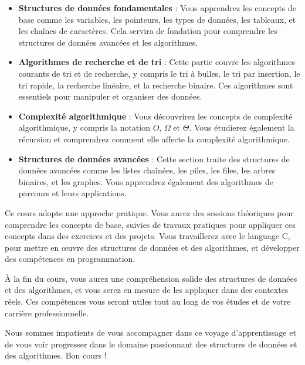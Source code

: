 \begin{itemize}
	\item \textbf{Structures de données fondamentales} : Vous apprendrez les concepts de base comme les variables, les pointeurs, les types de données, les tableaux, et les chaînes de caractères. Cela servira de fondation pour comprendre les structures de données avancées et les algorithmes.
	
	\item \textbf{Algorithmes de recherche et de tri} : Cette partie couvre les algorithmes courants de tri et de recherche, y compris le tri à bulles, le tri par insertion, le tri rapide, la recherche linéaire, et la recherche binaire. Ces algorithmes sont essentiels pour manipuler et organiser des données.
	
	\item \textbf{Complexité algorithmique} : Vous découvrirez les concepts de complexité algorithmique, y compris la notation $O$, $\Omega$ et $\Theta$. Vous étudierez également la récursion et comprendrez comment elle affecte la complexité algorithmique.
	
	\item \textbf{Structures de données avancées} : Cette section traite des structures de données avancées comme les listes chaînées, les piles, les files, les arbres binaires, et les graphes. Vous apprendrez également des algorithmes de parcours et leurs applications.
\end{itemize}

Ce cours adopte une approche pratique. Vous aurez des sessions théoriques pour comprendre les concepts de base, suivies de travaux pratiques pour appliquer ces concepts dans des exercices et des projets. Vous travaillerez avec le language C, pour mettre en œuvre des structures de données et des algorithmes, et développer des compétences en programmation.

À la fin du cours, vous aurez une compréhension solide des structures de données et des algorithmes, et vous serez en mesure de les appliquer dans des contextes réels. Ces compétences vous seront utiles tout au long de vos études et de votre carrière professionnelle.

Nous sommes impatients de vous accompagner dans ce voyage d'apprentissage et de vous voir progresser dans le domaine passionnant des structures de données et des algorithmes. Bon cours !

